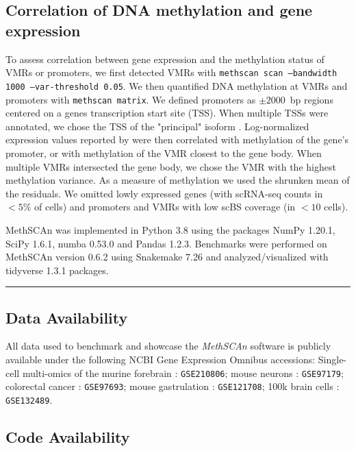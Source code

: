 \documentclass[10pt]{article}
\begin{document}
\subsection*{Correlation of DNA methylation and gene expression}
To assess correlation between gene expression and the methylation status of VMRs or promoters, we first detected VMRs with \texttt{methscan scan --bandwidth 1000 --var-threshold 0.05}.
We then quantified DNA methylation at VMRs and promoters with \texttt{methscan matrix}.
We defined promoters as $\pm2000$~bp regions centered on a genes transcription start site (TSS).
When multiple TSSs were annotated, we chose the TSS of the "principal" isoform \citep{appris}.
Log-normalized expression values reported by \citet{kremer_scnmt} were then correlated with methylation of the gene's promoter, or with methylation of the VMR closest to the gene body.
When multiple VMRs intersected the gene body, we chose the VMR with the highest methylation variance.
As a measure of methylation we used the shrunken mean of the residuals.
We omitted lowly expressed genes (with scRNA-seq counts in $<5\%$ of cells) and promoters and VMRs with low scBS coverage (in $<10$ cells).

MethSCAn was implemented in Python 3.8 using the packages NumPy 1.20.1, SciPy 1.6.1, numba 0.53.0 and Pandas 1.2.3. Benchmarks were performed on MethSCAn version 0.6.2 using Snakemake 7.26 and analyzed/visualized with tidyverse 1.3.1 packages. 
\vspace{1.4ex}
\noindent\hfil\rule{.6\columnwidth}{.2pt}\hfil



\subsection*{Data Availability}

All data used to benchmark and showcase the \textit{MethSCAn} software is publicly available under the following NCBI Gene Expression Omnibus accessions:
Single-cell multi-omics of the murine forebrain \citep{kremer_scnmt}: \texttt{GSE210806};
mouse neurons \citep{luo2017single}: \texttt{GSE97179};
colorectal cancer \citep{bian2018single}: \texttt{GSE97693};
mouse gastrulation \citep{argelaguet2019gastru}: \texttt{GSE121708};
100k brain cells \citep{liu2021dna}: \texttt{GSE132489}.


\subsection*{Code Availability}
\end{document}
